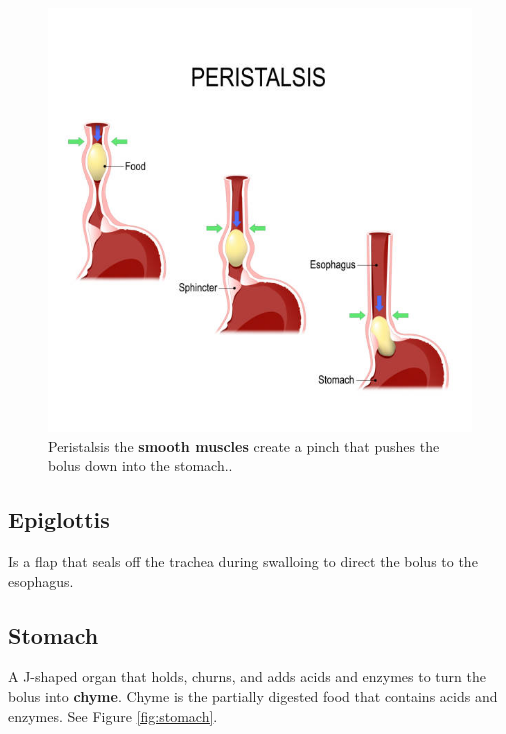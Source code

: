 \documentclass[12pt]{report}
\begin{document}
\begin{figure}[H]
\centering
    \includegraphics[width=\textwidth]{../figures/esophagus bolus.jpg}
    \caption{Peristalsis the \textbf{smooth muscles} create a pinch that pushes the bolus down into the stomach..}
    \label{esophagus-bolus}
\end{figure}

\subsection{Epiglottis}
\begin{definition}[Epiglottis]
    Is a flap that seals off the trachea during swalloing to direct the bolus to the esophagus.
\end{definition}

\subsection{Stomach}
\begin{definition}[Stomach]
    A J-shaped organ that holds, churns, and adds acids and enzymes to turn the bolus into \textbf{chyme}. Chyme is the partially digested food that contains acids and enzymes. See Figure \ref{fig:stomach}.
\end{definition}
\end{document}
